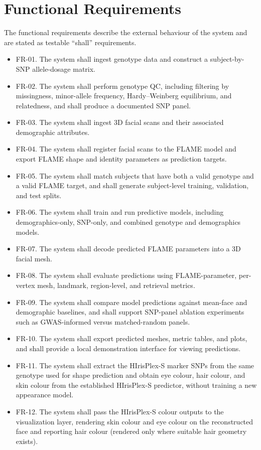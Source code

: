 \section{Functional Requirements}
The functional requirements describe the external behaviour of the system and are stated as testable ``shall'' requirements.
\begin{itemize}
\item FR-01. The system shall ingest genotype data and construct a subject-by-SNP allele-dosage matrix.
\item FR-02. The system shall perform genotype QC, including filtering by missingness, minor-allele frequency, Hardy--Weinberg equilibrium, and relatedness, and shall produce a documented SNP panel.
\item FR-03. The system shall ingest 3D facial scans and their associated demographic attributes.
\item FR-04. The system shall register facial scans to the FLAME model and export FLAME shape and identity parameters as prediction targets.
\item FR-05. The system shall match subjects that have both a valid genotype and a valid FLAME target, and shall generate subject-level training, validation, and test splits.
\item FR-06. The system shall train and run predictive models, including demographics-only, SNP-only, and combined genotype and demographics models.
\item FR-07. The system shall decode predicted FLAME parameters into a 3D facial mesh.
\item FR-08. The system shall evaluate predictions using FLAME-parameter, per-vertex mesh, landmark, region-level, and retrieval metrics.
\item FR-09. The system shall compare model predictions against mean-face and demographic baselines, and shall support SNP-panel ablation experiments such as GWAS-informed versus matched-random panels.
\item FR-10. The system shall export predicted meshes, metric tables, and plots, and shall provide a local demonstration interface for viewing predictions.
\item FR-11. The system shall extract the HIrisPlex-S marker SNPs from the same genotype used for shape prediction and obtain eye colour, hair colour, and skin colour from the established HIrisPlex-S predictor, without training a new appearance model.
\item FR-12. The system shall pass the HIrisPlex-S colour outputs to the visualization layer, rendering skin colour and eye colour on the reconstructed face and reporting hair colour (rendered only where suitable hair geometry exists).
\end{itemize}

